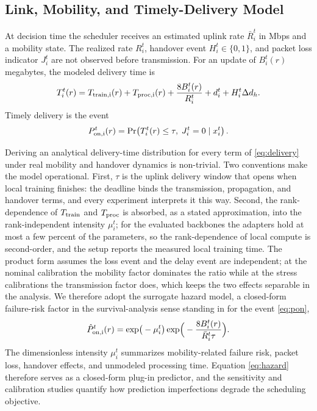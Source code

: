 \documentclass[a4paper,fleqn]{cas-dc}
\begin{document}
\subsection{Link, Mobility, and Timely-Delivery Model}
At decision time the scheduler receives an estimated uplink rate $\bar R_i^t$ in Mbps and a mobility state. The realized rate $R_i^t$, handover event $H_i^t\in\{0,1\}$, and packet loss indicator $J_i^t$ are not observed before transmission. For an update of $B_i^t(r)$ megabytes, the modeled delivery time is
\begin{equation}
T_i^t(r)=T_{\rm train,i}(r)+T_{\rm proc,i}(r)+\frac{8B_i^t(r)}{R_i^t}+d_i^t+H_i^t\Delta d_h.
\label{eq:delivery}
\end{equation}
Timely delivery is the event
\begin{equation}
P_{\rm on,i}^t(r)=\Pr\!\left(T_i^t(r)\le\tau,\;J_i^t=0\mid x_i^t\right).
\label{eq:pon}
\end{equation}
\par
Deriving an analytical delivery-time distribution for every term of \cref{eq:delivery} under real mobility and handover dynamics is non-trivial. Two conventions make the model operational. First, $\tau$ is the uplink delivery window that opens when local training finishes: the deadline binds the transmission, propagation, and handover terms, and every experiment interprets it this way. Second, the rank-dependence of $T_{\rm train}$ and $T_{\rm proc}$ is absorbed, as a stated approximation, into the rank-independent intensity $\mu_i^t$; for the evaluated backbones the adapters hold at most a few percent of the parameters, so the rank-dependence of local compute is second-order, and the setup reports the measured local training time. The product form assumes the loss event and the delay event are independent; at the nominal calibration the mobility factor dominates the ratio while at the stress calibrations the transmission factor does, which keeps the two effects separable in the analysis. We therefore adopt the surrogate hazard model, a closed-form failure-risk factor in the survival-analysis sense standing in for the event \cref{eq:pon},
\begin{equation}
\hat P_{\rm on,i}^t(r)=\exp\!\big(-\mu_i^t\big)\exp\!\Big(-\frac{8B_i^t(r)}{\bar R_i^t\tau}\Big).
\label{eq:hazard}
\end{equation}
The dimensionless intensity $\mu_i^t$ summarizes mobility-related failure risk, packet loss, handover effects, and unmodeled processing time. Equation \cref{eq:hazard} therefore serves as a closed-form plug-in predictor, and the sensitivity and calibration studies quantify how prediction imperfections degrade the scheduling objective.
\par
\end{document}
